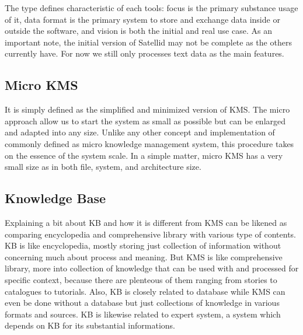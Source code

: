The type defines characteristic of each tools: focus is the primary substance usage of it, data format is the primary system to store and exchange data inside or outside the software, and vision is both the initial and real use case.
As an important note, the initial version of Satellid may not be complete as the others currently have.
For now we still only processes text data as the main features.

\subsection{Micro {KMS}}

It is simply defined as the simplified and minimized version of \ac{KMS}.
The micro approach allow us to start the system as small as possible but can be enlarged and adapted into any size.
Unlike any other concept and implementation of commonly defined as micro knowledge management system, this procedure takes on the essence of the system scale.
In a simple matter, micro \ac{KMS} has a very small size as in both file, system, and architecture size.

\subsection{Knowledge Base}

Explaining a bit about \ac{KB} and how it is different from \ac{KMS} can be likened as comparing encyclopedia and comprehensive library with various type of contents.
\ac{KB} is like encyclopedia, mostly storing just collection of information without concerning much about process and meaning.
But \ac{KMS} is like comprehensive library, more into collection of knowledge that can be used with and processed for specific context, because there are plenteous of them ranging from stories to catalogues to tutorials.
Also, \ac{KB} is closely related to database while \ac{KMS} can even be done without a database but just collections of knowledge in various formats and sources.
\ac{KB} is likewise related to expert system, a system which depends on \ac{KB} for its substantial informations.
